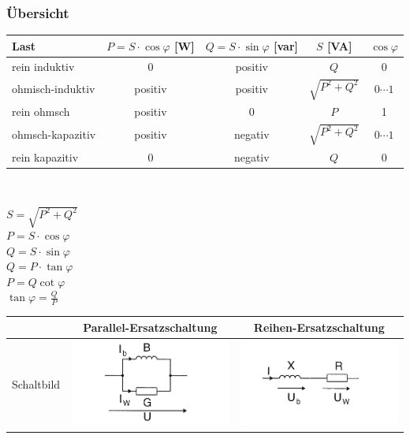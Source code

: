 		\subsubsection{Übersicht}
			\begin{centering}
			\begin{tabular}{|l|c|c|c|c|}
				\hline
					Last & $P=S\cdot\cos\varphi$  [W] & $Q=S\cdot\sin\varphi$  [var] & $S$ 
					[VA] & $\cos\varphi$
					\\
				\hline
					rein induktiv & 0 & positiv & $Q$ & 0\\
				\hline
					ohmisch-induktiv & positiv & positiv & $\sqrt{P^2+Q^2}$& $0\cdots1$\\
				\hline
					rein ohmsch & positiv & 0 & $P$ & 1 \\
				\hline
					ohmsch-kapazitiv & positiv & negativ & $\sqrt{P^2+Q^2}$& $0\cdots1$\\
				\hline
					rein kapazitiv & 0 & negativ & $Q$ & 0 \\
				\hline
			\end{tabular}\\
		\begin{multicols}{2}
				$S=\sqrt{P^2+Q^2}$\\
				$P=S\cdot \cos \varphi$\\
				$Q=S\cdot\sin\varphi$\\
				$Q=P\cdot\tan\varphi$\\
				$P=Q\cot\varphi$\\
				$\tan\varphi=\frac{Q}{P}$	
		\end{multicols}
	\begin{tabular}{|l|c|c|}
		\hline
			& Parallel-Ersatzschaltung & Reihen-Ersatzschaltung \\
		\hline
			Schaltbild & \includegraphics[width=5.5cm]{./images/RL_parallel.png} &
			\includegraphics[width=5.5cm]{./images/RL_Seriel.png}\\

\end{tabular}
\end{centering}
